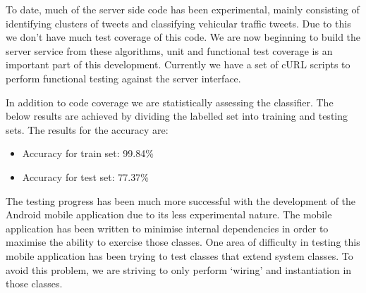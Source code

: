 To date, much of the server side code has been experimental, mainly consisting
of identifying clusters of tweets and classifying vehicular traffic tweets. Due
to this we don't have much test coverage of this code. We are now beginning to
build the server service from these algorithms, unit and functional test
coverage is an important part of this development. Currently we have a set of
cURL scripts to perform functional testing against the server interface.

In addition to code coverage we are statistically assessing the classifier. The
below results are achieved by dividing the labelled set into training and
testing sets. The results for the accuracy are:
\begin{itemize}
\item Accuracy for train set: 99.84\%
\item Accuracy for test set:  77.37\%
\end{itemize}

The testing progress has been much more successful with the development of the
Android mobile application due to its less experimental nature. The mobile
application has been written to minimise internal dependencies in order to
maximise the ability to exercise those classes. One area of difficulty in
testing this mobile application has been trying to test classes that extend
system classes. To avoid this problem, we are striving to only perform `wiring'
and instantiation in those classes.
